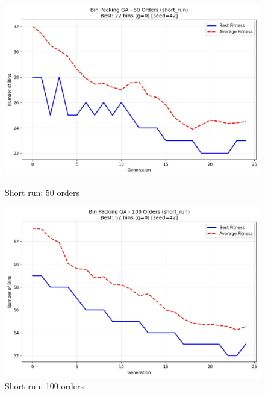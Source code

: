 \documentclass[journal,12pt,onecolumn]{IEEEtran}
\begin{document}
\begin{figure}[htbp]
\begin{minipage}{0.48\textwidth}
    \centering
    \includegraphics[width=\textwidth]{bpp_50items_short_run_seed42.png}
    \caption{Short run: 50 orders}
    \label{fig:short_run_50}
\end{minipage}\hfill
\begin{minipage}{0.48\textwidth}
    \centering
    \includegraphics[width=\textwidth]{bpp_100items_short_run_seed42.png}
    \caption{Short run: 100 orders}
    \label{fig:short_run_100}
\end{minipage}
\end{figure}
\end{document}
